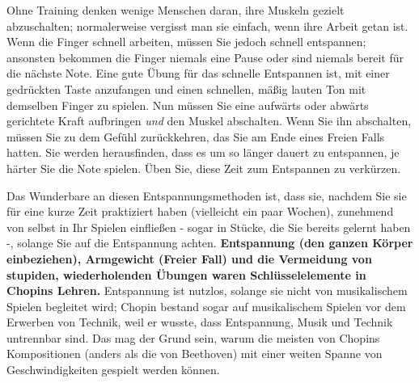 Ohne Training denken wenige Menschen daran, ihre Muskeln gezielt abzuschalten; normalerweise vergisst man sie einfach, wenn ihre Arbeit getan ist.
Wenn die Finger schnell arbeiten, müssen Sie jedoch schnell entspannen; ansonsten bekommen die Finger niemals eine Pause oder sind niemals bereit für die nächste Note.
Eine gute Übung für das schnelle Entspannen ist, mit einer gedrückten Taste anzufangen und einen schnellen, mäßig lauten Ton mit demselben Finger zu spielen.
Nun müssen Sie eine aufwärts oder abwärts gerichtete Kraft aufbringen \textit{und} den Muskel abschalten.
Wenn Sie ihn abschalten, müssen Sie zu dem Gefühl zurückkehren, das Sie am Ende eines Freien Falls hatten.
Sie werden herausfinden, dass es um so länger dauert zu entspannen, je härter Sie die Note spielen.
Üben Sie, diese Zeit zum Entspannen zu verkürzen.

Das Wunderbare an diesen Entspannungsmethoden ist, dass sie, nachdem Sie sie für eine kurze Zeit praktiziert haben (vielleicht ein paar Wochen), zunehmend von selbst in Ihr Spielen einfließen - sogar in Stücke, die Sie bereits gelernt haben -, solange Sie auf die Entspannung achten.
\textbf{Entspannung (den ganzen Körper einbeziehen), Armgewicht (Freier Fall) und die Vermeidung von stupiden, wiederholenden Übungen waren Schlüsselelemente in Chopins Lehren.}
Entspannung ist nutzlos, solange sie nicht von musikalischem Spielen begleitet wird; Chopin bestand sogar auf musikalischem Spielen vor dem Erwerben von Technik, weil er wusste, dass Entspannung, Musik und Technik untrennbar sind.
Das mag der Grund sein, warum die meisten von Chopins Kompositionen (anders als die von Beethoven) mit einer weiten Spanne von Geschwindigkeiten gespielt werden können.



